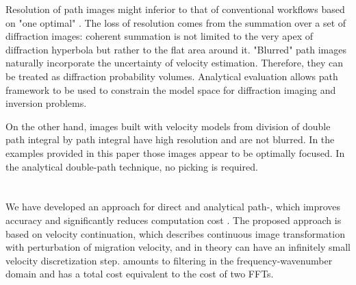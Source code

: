 Resolution of path images might  inferior to that of conventional workflows
based on  "one optimal" . The loss of resolution comes from the summation over a set
of diffraction images: coherent summation is not limited to the very apex of diffraction hyperbola but rather
to the flat area around it.
"Blurred" path images naturally incorporate the uncertainty of velocity estimation. Therefore,
they can be treated as diffraction probability volumes. Analytical evaluation allows path
 framework
to be used to constrain the model space
for diffraction imaging and inversion problems.


On the other hand, images built with velocity models from division of double path integral
by  path integral have 
high resolution and
are not blurred. In the examples provided in this paper those images appear to be optimally focused.
In the analytical double-path technique, no picking is required. 




\section{}
We have developed an approach for direct and analytical path-, which improves 
accuracy and significantly reduces  computation cost .
The proposed approach is based on velocity continuation, which
describes continuous image transformation with perturbation of migration velocity, and in theory
can have an infinitely small velocity discretization step. 
amounts to
filtering in the frequency-wavenumber domain and has a total cost equivalent to the cost of  two FFTs.

